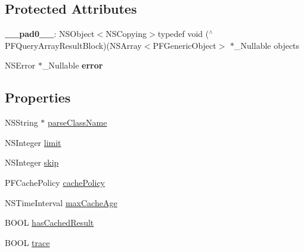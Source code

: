 \subsection*{Protected Attributes}
\begin{DoxyCompactItemize}
\item 
\hypertarget{class_p_f_query_acc6a1de03fc47b275965b1feefd9eb2c}{}{\bfseries \+\_\+\+\_\+pad0\+\_\+\+\_\+}\+: N\+S\+Object$<$N\+S\+Copying$>$typedef void ($^\wedge$P\+F\+Query\+Array\+Result\+Block)(N\+S\+Array$<$P\+F\+Generic\+Object$>$ $\ast$\+\_\+\+Nullable objects\label{class_p_f_query_acc6a1de03fc47b275965b1feefd9eb2c}

\item 
\hypertarget{class_p_f_query_a494d55d6a72c3280f679c9ecdcecf94d}{}N\+S\+Error $\ast$\+\_\+\+Nullable {\bfseries error}\label{class_p_f_query_a494d55d6a72c3280f679c9ecdcecf94d}

\end{DoxyCompactItemize}
\subsection*{Properties}
\begin{DoxyCompactItemize}
\item 
N\+S\+String $\ast$ \hyperlink{class_p_f_query_afba0f4baaf28a4b871fe5b9d5dc3604c}{parse\+Class\+Name}
\item 
N\+S\+Integer \hyperlink{class_p_f_query_a78060204fccd16a9ac9718b219778b64}{limit}
\begin{DoxyCompactList}\small\item\em 

 \end{DoxyCompactList}\item 
N\+S\+Integer \hyperlink{class_p_f_query_a2b5deec7ffc434a4c787f5aa0471ddcd}{skip}
\item 
P\+F\+Cache\+Policy \hyperlink{class_p_f_query_ad63ead0a9e38610875a9222bc9015b9d}{cache\+Policy}
\begin{DoxyCompactList}\small\item\em 

 \end{DoxyCompactList}\item 
N\+S\+Time\+Interval \hyperlink{class_p_f_query_a89e6f1c2e8ce45422b7a08fac4c36f24}{max\+Cache\+Age}
\item 
B\+O\+O\+L \hyperlink{class_p_f_query_a7b45d0efdce5b559714f9a6b6f40b972}{has\+Cached\+Result}
\item 
B\+O\+O\+L \hyperlink{class_p_f_query_a86849de3551a7ea56c652f55f48bfe47}{trace}
\begin{DoxyCompactList}\small\item\em 

 \end{DoxyCompactList}\end{DoxyCompactItemize}


